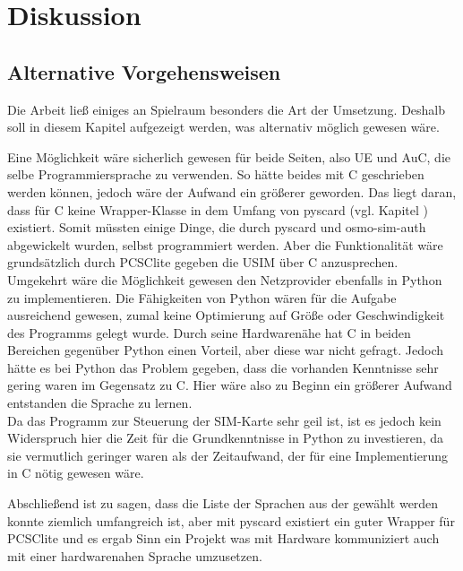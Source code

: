 \clearpage

\section{Diskussion}
\label{diskussion}

	\subsection{Alternative Vorgehensweisen}
	\label{diskussion-alternative}
	
	Die Arbeit ließ einiges an Spielraum besonders die Art der Umsetzung. Deshalb soll in
	diesem Kapitel aufgezeigt werden, was alternativ möglich gewesen wäre.
	
	Eine Möglichkeit wäre sicherlich gewesen für beide Seiten, also UE und AuC, die selbe
	Programmiersprache zu verwenden. So hätte beides mit C geschrieben werden können,
	jedoch wäre der Aufwand ein größerer geworden. Das liegt daran, dass für C keine
	Wrapper-Klasse in dem Umfang von pyscard (vgl. Kapitel ) existiert.
	Somit müssten einige Dinge, die durch pyscard und osmo-sim-auth abgewickelt wurden,
	selbst programmiert werden. Aber die Funktionalität wäre grundsätzlich durch PCSClite
	gegeben die USIM über C anzusprechen. \\
	Umgekehrt wäre die Möglichkeit gewesen den Netzprovider ebenfalls in Python zu
	implementieren. Die Fähigkeiten von Python wären für die Aufgabe ausreichend gewesen,
	zumal keine Optimierung auf Größe oder Geschwindigkeit des Programms gelegt wurde.
	Durch seine Hardwarenähe hat C in beiden Bereichen gegenüber Python einen Vorteil,
	aber diese war nicht gefragt. Jedoch hätte es bei Python das Problem gegeben, dass
	die vorhanden Kenntnisse sehr gering waren im Gegensatz zu C. Hier wäre also zu Beginn
	ein größerer Aufwand entstanden die Sprache zu lernen. \\
	Da das Programm zur Steuerung der SIM-Karte sehr geil ist, ist es jedoch kein Widerspruch
	hier die Zeit für die Grundkenntnisse in Python zu investieren, da sie vermutlich geringer
	waren als der Zeitaufwand, der für eine Implementierung in C nötig gewesen wäre.
	
	Abschließend ist zu sagen, dass die Liste der Sprachen aus der gewählt werden konnte
	ziemlich umfangreich ist, aber mit pyscard existiert ein guter Wrapper für PCSClite und
	es ergab Sinn ein Projekt was mit Hardware kommuniziert auch mit einer hardwarenahen
	Sprache umzusetzen.	
	
